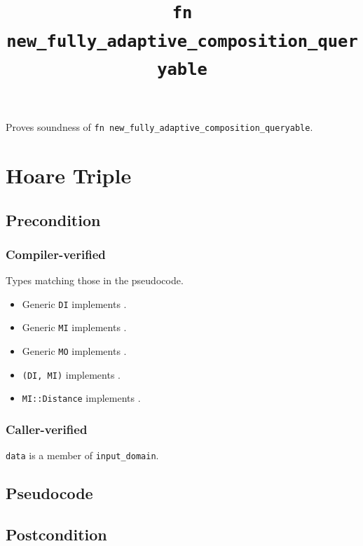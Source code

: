\documentclass{article}
\title{\texttt{fn new\_fully\_adaptive\_composition\_queryable}}
\author{\MichaelShoemateAuthor}
\date{}
\begin{document}
\maketitle
\contrib
Proves soundness of \texttt{fn new\_fully\_adaptive\_composition\_queryable}.

\section{Hoare Triple}
\subsection*{Precondition}
\subsubsection*{Compiler-verified}
Types matching those in the pseudocode.

\begin{itemize}
    \item Generic \texttt{DI} implements .
    \item Generic \texttt{MI} implements .
    \item Generic \texttt{MO} implements .
    \item \texttt{(DI, MI)} implements .
    \item \texttt{MI::Distance} implements .
\end{itemize}

\subsubsection*{Caller-verified}
\texttt{data} is a member of \texttt{input\_domain}.


\subsection*{Pseudocode}


\subsection*{Postcondition}
\begin{theorem}
\end{theorem}
\end{document}
